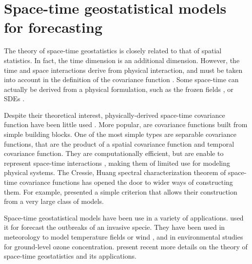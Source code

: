 \section{Space-time geostatistical models for forecasting}

The theory of space-time geostatistics is closely related to that of spatial statistics. In fact, the time dimension is an additional dimension. However, the time and space interactions derive from physical interaction, and must be taken into account in the definition of the covariance function \cite{Gneiting2010}. Some space-time can actually be derived from a physical formulation, such as the frozen fields \cite{Gneiting2010}, or SDEs \cite{Brown2000, North2011}.

Despite their theoretical interest, physically-derived space-time covariance function have been little used \cite{Gneiting2010}. More popular, are covariance functions built from simple building blocks. One of the most simple types are separable covariance functions, that are the product of a spatial covariance function and temporal covariance function. They are computationally efficient, but are enable to represent space-time interactions \cite{Cressie1999, Stein2005}, making them of limited use for modeling physical systems. The Cressie, Huang spectral characterization theorem of space-time covariance functions has opened the door to wider ways of constructing them. For example, \cite{Gneiting2002} presented a simple criterion that allows their construction from a very large class of models. 

Space-time geostatistical models have been use in a variety of applications. \cite{Hohn1993} used it for forecast the outbreaks of an invasive specie. They have been used in meteorology to model temperature fields \cite{Handcock1994, North2011} or wind \cite{Cressie1999, Gneiting2002}, and in environmental studies for ground-level ozone concentration. \cite{Gneiting2007, Gneiting2010} present recent more details on the theory of space-time geostatistics and its applications.  

